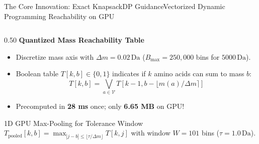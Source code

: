 \documentclass[aspectratio=169, 10pt]{beamer}
\begin{document}
\begin{frame}{The Core Innovation: Exact KnapsackDP Guidance}{Vectorized Dynamic Programming Reachability on GPU}
\begin{columns}[T]
\begin{column}{0.50\textwidth}
  \textbf{\footnotesize Quantized Mass Reachability Table}
  \begin{itemize}\setlength{\itemsep}{2pt}\scriptsize
    \item Discretize mass axis with $\Delta m = 0.02\,\text{Da}$ ($B_{\max} = 250,000$ bins for $5000\,\text{Da}$).
    \item Boolean table $T[k, b] \in \{0, 1\}$ indicates if $k$ amino acids can sum to mass $b$:
    \begin{equation*}
      T[k, b] = \bigvee_{a \in \mathcal{V}} T[k-1, b - \lfloor m(a)/\Delta m \rceil]
    \end{equation*}
    \item Precomputed in \textbf{28 ms} once; only \textbf{6.65 MB} on GPU!
  \end{itemize}
  \vspace{0.05cm}
  \begin{block}{\scriptsize 1D GPU Max-Pooling for Tolerance Window}
    \tiny
    $T_{\text{pooled}}[k, b] = \max_{|j - b| \le \lfloor \tau/\Delta m \rfloor} T[k, j]$ with window $W=101$ bins ($\tau = 1.0\,\text{Da}$).
  \end{block}
\end{column}


\end{columns}
\end{frame}
\end{document}
